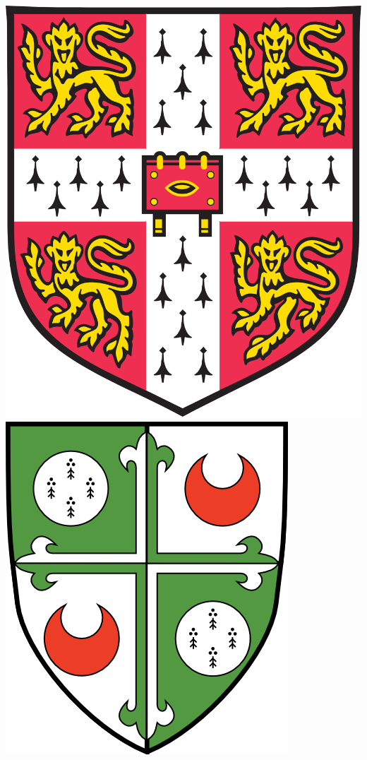 \documentclass[a4 paper,twoside,openright,12pt]{book}
\begin{document}
\begin{titlepage}
\centerline{\includegraphics[scale=0.04]{cambridge.png}\hspace{0.3in}\includegraphics[scale=0.197]{girton.png}}

\end{titlepage}
\end{document}
